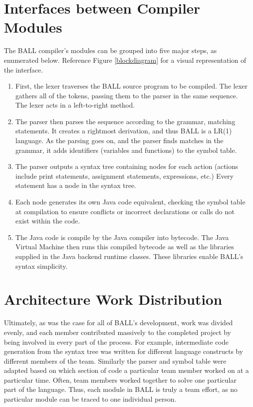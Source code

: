 \documentclass[letterpaper,oneside,12pt, pdftex]{report}
\begin{document}
\section{Interfaces between Compiler Modules}\label{interfaces}
The BALL compiler's modules can be grouped into five major steps, as
enumerated below. Reference Figure \ref{blockdiagram} for a visual
representation of the interface.
\begin{enumerate}
\item First, the lexer traverses the BALL source program to be
  compiled. The lexer gathers all of the tokens, passing them to the
  parser in the same sequence. The lexer acts in a left-to-right
  method.
\item The parser then parses the sequence according to the grammar,
  matching statements. It creates a rightmost derivation, and thus
  BALL is a LR(1) language. As the parsing goes on, and the parser
  finds matches in the grammar, it adds identifiers (variables and
  functions) to the symbol table.
\item The parser outputs a syntax tree containing nodes for each
  action (actions include print statements, assignment statements,
  expressions, etc.) Every statement has a node in the syntax tree.
\item Each node generates its own Java code equivalent, checking the
  symbol table at compilation to ensure conflicts or incorrect
  declarations or calls do not exist within the code.
\item The Java code is compile by the Java compiler into bytecode. The
  Java Virtual Machine then runs this compiled bytecode as well as the
  libraries supplied in the Java backend runtime classes. These
  libraries enable BALL's syntax simplicity.
\end{enumerate}
\section{Architecture Work Distribution}
Ultimately, as was the case for all of BALL's development, work was
divided evenly, and each member contributed massively to the completed
project by being involved in every part of the process. For example,
intermediate code generation from the syntax tree was written for
different language constructs by different members of the
team. Similarly the parser and symbol table were adapted based on
which section of code a particular team member worked on at a
particular time. Often, team members worked together to solve one
particular part of the language. Thus, each module in BALL is truly a
team effort, as no particular module can be traced to one individual
person.
\end{document}
